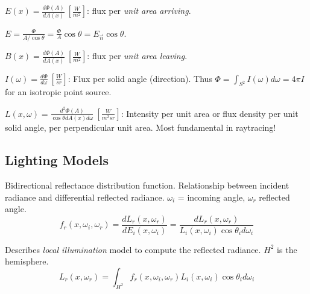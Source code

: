 \begin{definition}[Irradiance]
  \(E(x) = \frac{d \Phi(A)}{d A(x)} \ \left[\frac{W}{m^2}\right]\):
  flux per \textit{unit area arriving}.
\end{definition}

\begin{algorithm}
  \(E =\frac{\Phi}{A / \cos \theta} = \frac{\Phi}{A} \cos \theta = E_{\vec{n}} \cos \theta\).
\end{algorithm}

\begin{definition}[Radiosity]
  \(B(x) = \frac{d\Phi(A)}{dA(x)} \ \left[\frac{W}{m^2}\right]\):
  flux per \textit{unit area leaving}.
\end{definition}

\begin{definition}[Intensity]
  \(I(\omega) = \frac{d\Phi}{d\omega} \ \left[\frac{W}{sr}\right]\):
  Flux per solid angle (direction). Thus \(\Phi = \int_{S^2} I(\omega) d\omega = 4 \pi I\) for an isotropic point source.
\end{definition}

\begin{definition}[Radiance]
  \(L(x, \omega) = \frac{d^2 \Phi(A)}{\cos \theta dA(x) d\omega} \ \left[\frac{W}{m^2sr}\right]\):
  Intensity per unit area or flux density per unit solid angle, per perpendicular unit area. Most fundamental in raytracing!
\end{definition}

\subsection{Lighting Models}
\begin{definition}[BRDF]
  Bidirectional reflectance distribution function. Relationship between incident radiance and differential reflected radiance. \(\omega_i\) = incoming angle, \(\omega_r\) reflected angle.
  \[f_r(x, \omega_i, \omega_r) = \frac{dL_r(x, \omega_r)}{dE_i(x, \omega_i)} = \frac{dL_r(x, \omega_r)}{L_i(x, \omega_i) \cos \theta_i d\omega_i}\]
\end{definition}

\begin{definition}
  Describes \textit{local illumination} model to compute the reflected radiance. \(H^2\) is the hemisphere.
  \[L_r(x, \omega_r) = \int_{H^2}f_r(x, \omega_i, \omega_r)L_i(x, \omega_i) \cos \theta_i d \omega_i\]
\end{definition}

